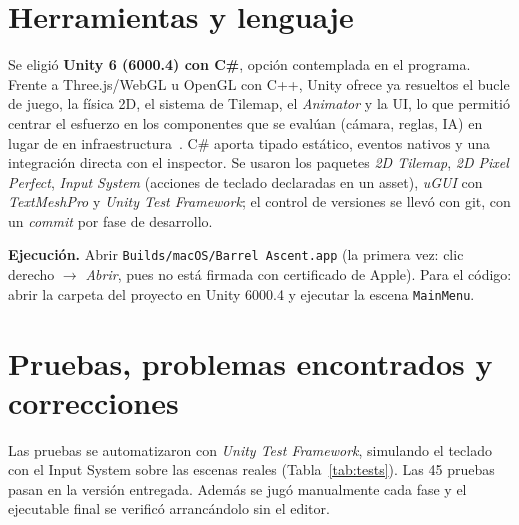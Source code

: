 \documentclass[runningheads]{llncs}
\begin{document}
\section{Herramientas y lenguaje}
Se eligió \textbf{Unity 6 (6000.4) con C\#}, opción contemplada en el programa. Frente a
Three.js/WebGL u OpenGL con C++, Unity ofrece ya resueltos el bucle de juego, la física 2D, el sistema
de Tilemap, el \emph{Animator} y la UI, lo que permitió centrar el esfuerzo en los componentes que se
evalúan (cámara, reglas, IA) en lugar de en infraestructura~\cite{gregory}. C\# aporta tipado estático,
eventos nativos y una integración directa con el inspector. Se usaron los paquetes \emph{2D Tilemap},
\emph{2D Pixel Perfect}, \emph{Input System} (acciones de teclado declaradas en un asset), \emph{uGUI}
con \emph{TextMeshPro} y \emph{Unity Test Framework}; el control de versiones se llevó con git, con un
\emph{commit} por fase de desarrollo.

\textbf{Ejecución.} Abrir \texttt{Builds/macOS/Barrel Ascent.app} (la primera vez: clic derecho
$\rightarrow$ \emph{Abrir}, pues no está firmada con certificado de Apple). Para el código: abrir la
carpeta del proyecto en Unity 6000.4 y ejecutar la escena \texttt{MainMenu}.

\section{Pruebas, problemas encontrados y correcciones}
Las pruebas se automatizaron con \emph{Unity Test Framework}, simulando el teclado con el Input
System sobre las escenas reales (Tabla~\ref{tab:tests}). Las 45 pruebas pasan en la versión entregada.
Además se jugó manualmente cada fase y el ejecutable final se verificó arrancándolo sin el editor.
\end{document}
